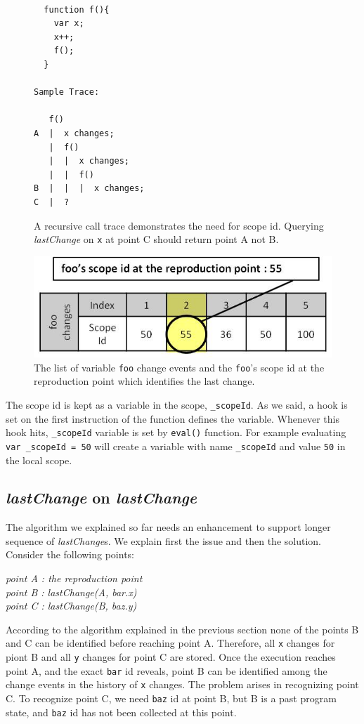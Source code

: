 \documentclass[preprint]{sigplanconf}
\begin{document}
\begin{figure}[htp]
\begin{verbatim}

  function f(){
    var x;
    x++;
    f();
  }

Sample Trace:

   f()
A  |  x changes; 
   |  f()
   |  |  x changes;
   |  |  f()
B  |  |  |  x changes; 
C  |  ?

\end{verbatim}
\caption{A recursive call trace demonstrates the need for scope id. Querying \textit{lastChange} on \texttt{x} at point C should return point A not B.}
\label{fig:recursive}
\end{figure}

\begin{figure}[htp]
\includegraphics[width=.48\textwidth]{7-foo-changes2.jpg}
\caption{The list of variable \texttt{foo} change events and the \texttt{foo}'s scope id at the reproduction point which identifies the last change.}
\label{fig:foo-changes2}
\end{figure}

The scope id is kept as a variable in the scope, \texttt{\_scopeId}. As we said, a hook is set on the first instruction of the function defines the variable. Whenever this hook hits,  \texttt{\_scopeId} variable is set by \texttt{eval()} function. For example evaluating \texttt{var \_scopeId = 50} will create a variable with name \texttt{\_scopeId} and value \texttt{50} in the local scope.
 
\subsection{\textit{lastChange} on \textit{lastChange}}
The algorithm we explained so far needs an enhancement to support longer sequence of \textit{lastChange}s. We explain first the issue and then the solution. Consider the following points:

\begin{center}
\textit{
 point A : the reproduction point \\
 point B : lastChange(A, bar.x) \\
 point C : lastChange(B, baz.y) 
 }
 \end{center}
According to the algorithm explained in the previous section none of the points B and C can be identified before reaching point A. Therefore, all \texttt{x} changes for piont B and all \texttt{y} changes for point C are stored. Once the execution reaches point A, and the exact \texttt{bar} id reveals, point B can be identified among the change events in the history of \texttt{x} changes. The problem arises in recognizing point C. To recognize point C, we need \texttt{baz} id at point B, but B is a past program state, and \texttt{baz} id has not been collected at this point. 
\end{document}
